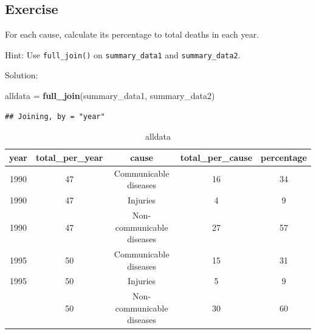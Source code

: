 \documentclass[12pt,]{krantz}
\makeatletter
\newenvironment{Shaded}{\begin{snugshade}}{\end{snugshade}}
\newcommand{\DecValTok}[1]{\textcolor[rgb]{0.00,0.00,0.81}{#1}}
\newcommand{\KeywordTok}[1]{\textcolor[rgb]{0.13,0.29,0.53}{\textbf{#1}}}
\newcommand{\NormalTok}[1]{#1}
\newcommand{\OperatorTok}[1]{\textcolor[rgb]{0.81,0.36,0.00}{\textbf{#1}}}
\newcommand{\StringTok}[1]{\textcolor[rgb]{0.31,0.60,0.02}{#1}}
\newenvironment{kframe}{%
\medskip{}
\setlength{\fboxsep}{.8em}
 \def\at@end@of@kframe{}%
 \ifinner\ifhmode%
  \def\at@end@of@kframe{\end{minipage}}%
  \begin{minipage}{\columnwidth}%
 \fi\fi%
 \def\FrameCommand##1{\hskip\@totalleftmargin \hskip-\fboxsep
 \colorbox{shadecolor}{##1}\hskip-\fboxsep
     \hskip-\linewidth \hskip-\@totalleftmargin \hskip\columnwidth}%
 \MakeFramed {\advance\hsize-\width
   \@totalleftmargin\z@ \linewidth\hsize
   \@setminipage}}%
 {\par\unskip\endMakeFramed%
 \at@end@of@kframe}
\renewenvironment{Shaded}{\begin{kframe}}{\end{kframe}}
\theoremstyle{definition}
\theoremstyle{definition}
\theoremstyle{definition}
\theoremstyle{remark}
\makeatother
\begin{document}
\hypertarget{exercise-12}{%
\subsection{Exercise}\label{exercise-12}}

For each cause, calculate its percentage to total deaths in each year.

Hint: Use \texttt{full\_join()} on \texttt{summary\_data1} and
\texttt{summary\_data2}.

Solution:

\begin{Shaded}
\begin{Highlighting}[]
\NormalTok{alldata =}\StringTok{ }\KeywordTok{full_join}\NormalTok{(summary_data1, summary_data2)}
\end{Highlighting}
\end{Shaded}

\begin{verbatim}
## Joining, by = "year"
\end{verbatim}

\begin{Shaded}
\end{Shaded}

\begin{table}[t]

\caption{\label{tab:unnamed-chunk-10}alldata}
\centering
\begin{tabular}{ccccc}
\toprule
year & total\_per\_year & cause & total\_per\_cause & percentage\\
\midrule
1990 & 47 & Communicable diseases & 16 & 34\\
1990 & 47 & Injuries & 4 & 9\\
1990 & 47 & Non-communicable diseases & 27 & 57\\
1995 & 50 & Communicable diseases & 15 & 31\\
1995 & 50 & Injuries & 5 & 9\\
\addlinespace
1995 & 50 & Non-communicable diseases & 30 & 60\\
\bottomrule
\end{tabular}
\end{table}
\end{document}
